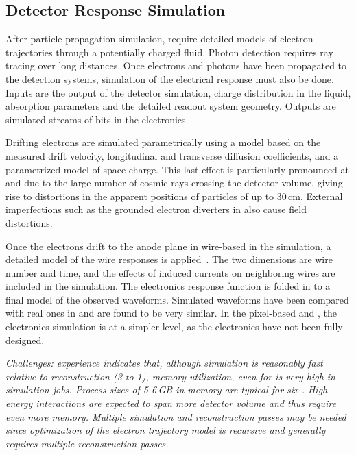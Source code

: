 \documentclass[../main-v1.tex]{subfiles}
\begin{document}
\subsection{Detector Response Simulation}
After particle propagation simulation, 
 require detailed models of electron trajectories through a potentially charged fluid.  Photon detection requires ray tracing over long distances.  Once electrons and photons have been propagated to the detection systems, simulation of the electrical response must also be done. Inputs are the output of the detector simulation, charge distribution in the liquid, absorption parameters and the detailed readout system geometry. Outputs are simulated streams of bits in the electronics. 

  




Drifting electrons are simulated parametrically using a model based on the measured drift velocity, longitudinal and transverse diffusion coefficients, and a parametrized model of space charge.  This last effect is particularly pronounced at  and  due to the large number of cosmic rays crossing the detector volume, giving rise to distortions in the apparent positions of particles of up to 30\,cm.  %
External imperfections such as the grounded electron diverters in  also cause field distortions.

Once the electrons drift to the anode plane in wire-based  in the simulation, a detailed \twod model of the wire responses is applied~\cite{Abi:2020mwi}.  The two dimensions are wire number and time, and the effects of induced currents on neighboring wires are included in the simulation.  The electronics response function is folded in to a final model of the observed waveforms.  Simulated waveforms have been compared with real ones  in  and are found to be very similar.
In the pixel-based  and , the electronics simulation is at a simpler level, as the electronics have not been fully designed.

{\it Challenges:  
 experience indicates that, although simulation is reasonably fast relative to reconstruction (3 to 1), memory utilization, even for  %
is very high in simulation jobs.  Process sizes of 5-6\,GB in memory are typical for six .  High energy  interactions are expected to span more detector volume and thus require even more memory. Multiple %
simulation and reconstruction passes may be needed since optimization of the electron trajectory model is recursive and generally requires multiple reconstruction passes. }
\end{document}
